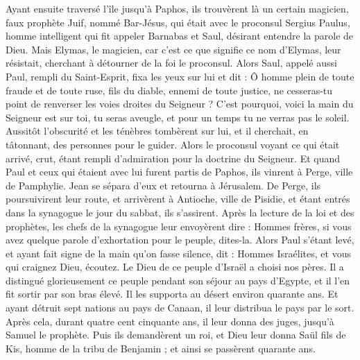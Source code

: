 \begin{multicols}{2}
Ayant ensuite traversé l'île jusqu'à Paphos, ils trouvèrent là un certain magicien, faux prophète Juif, nommé Bar-Jésus,
qui était avec le proconsul Sergius Paulus, homme intelligent qui fit appeler Barnabas et Saul, désirant entendre la parole de Dieu.
Mais Elymas, le magicien, car c'est ce que signifie ce nom d'Elymas, leur résistait, cherchant à détourner de la foi le proconsul.
Alors Saul, appelé aussi Paul, rempli du Saint-Esprit, fixa les yeux sur lui et dit :
Ô homme plein de toute fraude et de toute ruse, fils du diable, ennemi de toute justice, ne cesseras-tu point de renverser les voies droites du Seigneur ?
C'est pourquoi, voici la main du Seigneur est sur toi, tu seras aveugle, et pour un temps tu ne verras pas le soleil. Aussitôt l'obscurité et les ténèbres tombèrent sur lui, et il cherchait, en tâtonnant, des personnes pour le guider.
Alors le proconsul voyant ce qui était arrivé, crut, étant rempli d'admiration pour la doctrine du Seigneur.
Et quand Paul et ceux qui étaient avec lui furent partis de Paphos, ils vinrent à Perge, ville de Pamphylie. Jean se sépara d'eux et retourna à Jérusalem.
De Perge, ils poursuivirent leur route, et arrivèrent à Antioche, ville de Pisidie, et étant entrés dans la synagogue le jour du sabbat, ils s'assirent.
Après la lecture de la loi et des prophètes, les chefs de la synagogue leur envoyèrent dire : Hommes frères, si vous avez quelque parole d'exhortation pour le peuple, dites-la.
Alors Paul s'étant levé, et ayant fait signe de la main qu'on fasse silence, dit : Hommes Israélites, et vous qui craignez Dieu, écoutez.
Le Dieu de ce peuple d'Israël a choisi nos pères. Il a distingué glorieusement ce peuple pendant son séjour au pays d'Egypte, et il l'en fit sortir par son bras élevé.
Il les supporta au désert environ quarante ans.
Et ayant détruit sept nations au pays de Canaan, il leur distribua le pays par le sort.
Après cela, durant quatre cent cinquante ans, il leur donna des juges, jusqu'à Samuel le prophète.
Puis ils demandèrent un roi, et Dieu leur donna Saül fils de Kis, homme de la tribu de Benjamin ; et ainsi se passèrent quarante ans.

\end{multicols}

